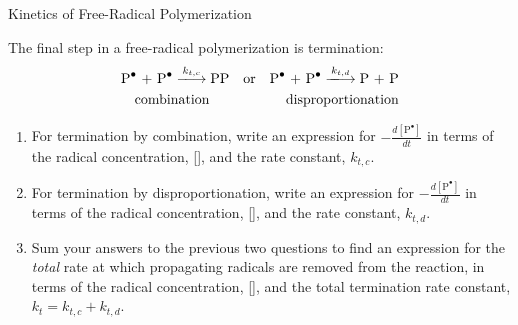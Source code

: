 \begin{activity}{Kinetics of Free-Radical Polymerization}
\begin{ctqs}
	\question The final step in a free-radical polymerization is termination:
		\begin{align*}
			\text{\ce{P^.} + \ce{P^.}} \xlongrightarrow{k_{t,c}} \text{\ce{PP}} && \text{or} && \text{\ce{P^.} + \ce{P^.}} \xlongrightarrow{k_{t,d}} \text{P + P}\\
			\text{combination\hspace{0.5cm}} && && \text{disproportionation}
		\end{align*}
		
		\begin{enumerate}
			\item For termination by combination, write an expression for $-\frac{d[\text{P}^{\bullet}]}{dt}$ in terms of the radical concentration, [], and the rate constant, $k_{t,c}$.
			
				\begin{solution}[0.75in]\end{solution}
			
			\item For termination by disproportionation, write an expression for $-\frac{d[\text{P}^{\bullet}]}{dt}$ in terms of the radical concentration, [], and the rate constant, $k_{t,d}$.
			
				\begin{solution}[0.75in]\end{solution}
			
			\item Sum your answers to the previous two questions to find an expression for the \emph{total} rate at which propagating radicals are removed from the reaction, in terms of the radical concentration, [], and the total termination rate constant, $k_t = k_{t,c} + k_{t,d}$.
			
				\begin{solution}[0.75in]\end{solution}
				

\end{enumerate}
\end{ctqs}
\end{activity}
